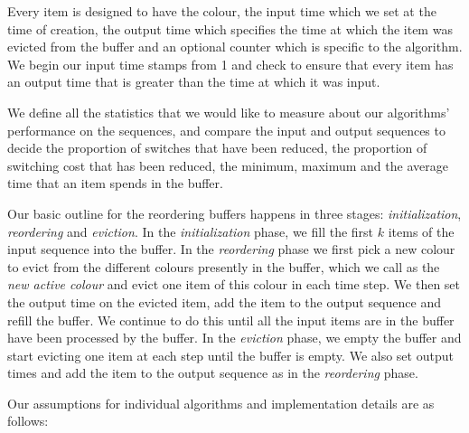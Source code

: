 Every item is designed to have the colour, the input time which we set at the time of creation, the output time which specifies the time at which the item was evicted from the buffer and an optional counter which is specific to the algorithm. We begin our input time stamps from 1 and check to ensure that every item has an output time that is greater than the time at which it was input.

We define all the statistics that we would like to measure about our algorithms' performance on the sequences, and compare the input and output sequences to decide the proportion of switches that have been reduced, the proportion of switching cost that has been reduced, the minimum, maximum and the average time that an item spends in the buffer. 

Our basic outline for the reordering buffers happens in three stages: \textit{initialization}, \textit{reordering} and \textit{eviction}. In the \textit{initialization} phase, we fill the first $k$ items of the input sequence into the buffer. In the \textit{reordering} phase we first pick a new colour to evict from the different colours presently in the buffer, which we call as the \textit{new active colour} and evict one item of this colour in each time step. We then set the output time on the evicted item, add the item to the output sequence and refill the buffer. We continue to do this until all the input items are in the buffer have been processed by the buffer. In the \textit{eviction} phase, we empty the buffer and start evicting one item at each step until the buffer is empty. We also set output times and add the item to the output sequence as in the \textit{reordering} phase.

Our assumptions for individual algorithms and implementation details are as follows: 

